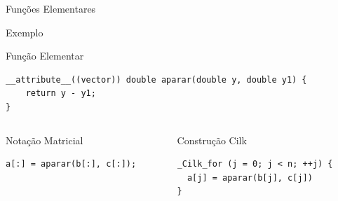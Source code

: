 \documentclass{beamer}
\begin{document}
\begin{frame}[fragile]{Funções Elementares}
\begin{scriptsize}
\begin{block}{Exemplo}
\begin{block}{Função Elementar}
\begin{lstlisting}
__attribute__((vector)) double aparar(double y, double y1) {
    return y - y1;
}
\end{lstlisting}
\end{block}
\begin{columns}
\begin{column}{0.4\textwidth}
\begin{block}{Notação Matricial}
\begin{lstlisting}
a[:] = aparar(b[:], c[:]);
\end{lstlisting}
\end{block}

\end{column}
\begin{column}{0.4\textwidth}
\begin{block}{Construção Cilk}
\begin{lstlisting}
_Cilk_for (j = 0; j < n; ++j) {
  a[j] = aparar(b[j], c[j])
}
\end{lstlisting}
\end{block}
\end{column}
\end{columns}

\end{block}
\end{scriptsize}
\end{frame}
\end{document}
